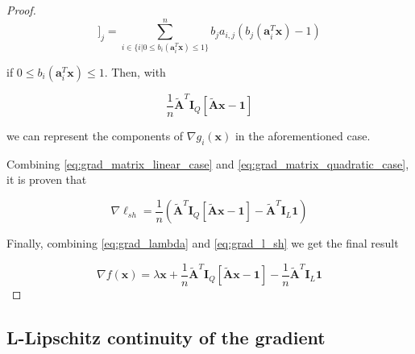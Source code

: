 \documentclass[12pt]{article}
\newcommand{\xb}{\mathbf{x}}
\newcommand{\ab}{\mathbf{a}}
\newcommand{\abi}{\ab_i}
\newcommand{\ellsh}{\ell_{sh}}
\newcommand{\ax}{\abi^T\xb}
\newcommand{\atilde}{\mathbf{\tilde{A}}}
\newcommand{\id}{\mathbf{I}}
\newcommand{\ones}{\mathbf{1}}
\begin{document}
\begin{proof}
\begin{equation*}
    [\atilde^T\id_Q[\atilde \xb - \ones]]_j =
    \sum_{i \in \{i | 0 \leq b_i(\ax) \leq 1\}}^{n} b_j a_{i, j} (b_j(\ax) - 1)
\end{equation*}

if $0 \leq b_i(\ax) \leq 1$. Then, with 

\begin{equation} \label{eq:grad_matrix_quadratic_case}
    \frac{1}{n}\atilde^T\id_Q[\atilde \xb - \ones]
\end{equation}

we can represent the components of $\nabla g_i(\xb)$ in the aforementioned case.

Combining \eqref{eq:grad_matrix_linear_case} and \eqref{eq:grad_matrix_quadratic_case}, it is proven that

\begin{equation} \label{eq:grad_l_sh}
    \nabla \ellsh = \frac{1}{n}(\atilde^T\id_Q[\atilde \xb - \ones] - \atilde^T\id_L\ones)
\end{equation}

Finally, combining \eqref{eq:grad_lambda} and \eqref{eq:grad_l_sh} we get the final result

\begin{equation}
    \nabla f(\xb) = \lambda\xb + \frac{1}{n}\atilde^T\id_Q[\atilde \xb - \ones] - \frac{1}{n}\atilde^T\id_L\ones
\end{equation}

\end{proof}

\subsection*{L-Lipschitz continuity of the gradient}
\end{document}
